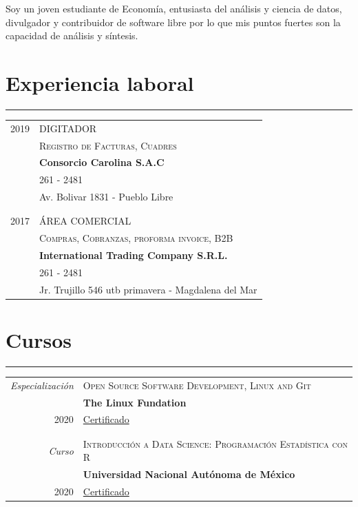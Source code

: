 \documentclass[a4paper,10pt]{article}
\newcommand{\tvspace}{\footnotesize{}\\\multicolumn{2}{c}{}}
\begin{document}
	Soy un joven estudiante de Economía, entusiasta del análisis y ciencia de datos, divulgador y contribuidor de software libre por lo que mis puntos fuertes son la capacidad de análisis y síntesis.

\section{Experiencia laboral}
	\hrule
	\begin{tabular}{r|p{11cm}}
		\textsc{2019}             & \textsc{DIGITADOR}\\
				                      & \textsc{Registro de Facturas, Cuadres}\\
				                      & \textbf{Consorcio Carolina S.A.C} \\
				                      & 261 - 2481 \\
				                      & Av. Bolivar 1831 - Pueblo Libre\\
															& \tvspace \\

		\textsc{2017}             & \textsc{ÁREA COMERCIAL}\\
				                      & \textsc{Compras, Cobranzas, proforma invoice, B2B}\\
				                      & \textbf{International Trading Company S.R.L.} \\
				                      & 261 - 2481 \\
				                      & Jr. Trujillo 546 utb primavera - Magdalena del Mar
	\end{tabular}

\newpage

\section{Cursos}
\hrule

	\begin{tabular}{r|p{11cm}}
 		\emph{Especialización}       & \textsc{Open Source Software Development, Linux and Git}\\
				                         & \textbf{The Linux Fundation}\\
		\textsc{2020}                & \href{https://www.coursera.org/verify/specialization/S9NNU5BM4SWU}{Certificado}\\
				                         & \tvspace \\

  	\emph{Curso}                 & \textsc{Introducción a Data Science: Programación Estadística con R}\\
				                         & \textbf{Universidad Nacional Autónoma de México}\\
		\textsc{2020}                & \href{https://www.coursera.org/verify/V6A9ZS2CMAP2}{Certificado}\\
	\end{tabular}
\end{document}
